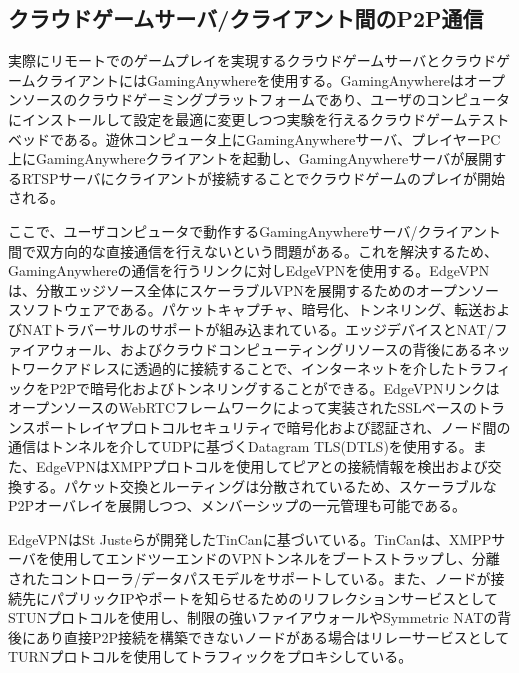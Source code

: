 \subsection{クラウドゲームサーバ/クライアント間のP2P通信}
実際にリモートでのゲームプレイを実現するクラウドゲームサーバとクラウドゲームクライアントにはGamingAnywhereを使用する。GamingAnywhereはオープンソースのクラウドゲーミングプラットフォームであり、ユーザのコンピュータにインストールして設定を最適に変更しつつ実験を行えるクラウドゲームテストベッドである。遊休コンピュータ上にGamingAnywhereサーバ、プレイヤーPC上にGamingAnywhereクライアントを起動し、GamingAnywhereサーバが展開するRTSPサーバにクライアントが接続することでクラウドゲームのプレイが開始される。

ここで、ユーザコンピュータで動作するGamingAnywhereサーバ/クライアント間で双方向的な直接通信を行えないという問題がある。これを解決するため、GamingAnywhereの通信を行うリンクに対しEdgeVPN\cite{edgevpn}を使用する。EdgeVPNは、分散エッジソース全体にスケーラブルVPNを展開するためのオープンソースソフトウェアである。パケットキャプチャ、暗号化、トンネリング、転送およびNATトラバーサルのサポートが組み込まれている。エッジデバイスとNAT/ファイアウォール、およびクラウドコンピューティングリソースの背後にあるネットワークアドレスに透過的に接続することで、インターネットを介したトラフィックをP2Pで暗号化およびトンネリングすることができる。EdgeVPNリンクはオープンソースのWebRTCフレームワークによって実装されたSSLベースのトランスポートレイヤプロトコルセキュリティで暗号化および認証され、ノード間の通信はトンネルを介してUDPに基づくDatagram TLS(DTLS)\cite{dtlc}を使用する。また、EdgeVPNはXMPPプロトコル\cite{xmpp}を使用してピアとの接続情報を検出および交換する。パケット交換とルーティングは分散されているため、スケーラブルなP2Pオーバレイを展開しつつ、メンバーシップの一元管理も可能である。

EdgeVPNはSt Justeら\cite{tincan}が開発したTinCanに基づいている。TinCanは、XMPPサーバを使用してエンドツーエンドのVPNトンネルをブートストラップし、分離されたコントローラ/データパスモデルをサポートしている。また、ノードが接続先にパブリックIPやポートを知らせるためのリフレクションサービスとしてSTUNプロトコル\cite{stun}を使用し、制限の強いファイアウォールやSymmetric NATの背後にあり直接P2P接続を構築できないノードがある場合はリレーサービスとしてTURNプロトコル\cite{turn}を使用してトラフィックをプロキシしている。

